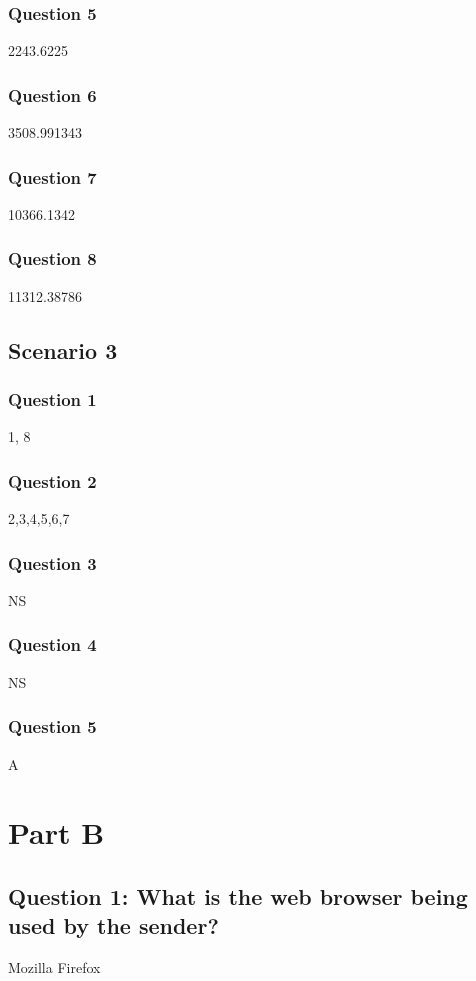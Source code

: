 \documentclass[11pt, oneside, a4paper]{article}
\begin{document}
\subsubsection*{Question 5}
2243.6225

\subsubsection*{Question 6}
3508.991343

\subsubsection*{Question 7}
10366.1342

\subsubsection*{Question 8}
11312.38786

\subsection*{Scenario 3}
\subsubsection*{Question 1}
1, 8 

\subsubsection*{Question 2}
2,3,4,5,6,7

\subsubsection*{Question 3}
NS

\subsubsection*{Question 4}
NS

\subsubsection*{Question 5}
A

\newpage
\section*{Part B}

\subsection*{Question 1: What is the web browser being used by the sender?}
Mozilla Firefox
\end{document}
